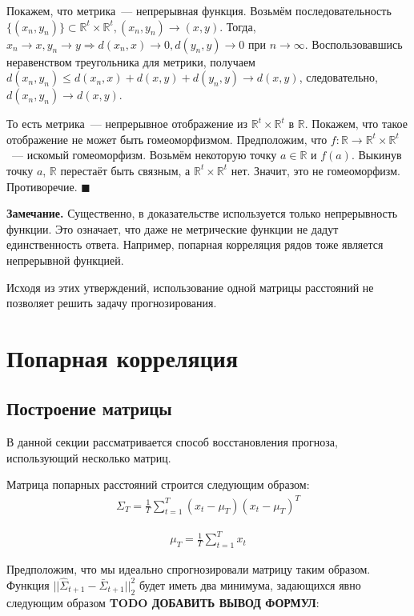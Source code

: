\documentclass{article}
\begin{document}
Покажем, что метрика~--- непрерывная функция. Возьмём последовательность $\{(x_n, y_n)\} \subset \mathbb{R}^t \times \mathbb{R}^t, (x_n, y_n) \to (x, y)$. Тогда, $x_n\to x, y_n\to y \Rightarrow d(x_n,x)\to 0 ,d(y_n,y)\to 0$ при $n \to \infty$. Воспользовавшись неравенством треугольника для метрики, получаем $d(x_n,y_n)\leq d(x_n,x)+d(x,y)+d(y_n,y)\to d(x,y)$, следовательно, $d(x_n,y_n)\to d(x,y)$.

То есть метрика~--- непрерывное отображение из $\mathbb{R}^t \times \mathbb{R}^t$ в $\mathbb{R}$. Покажем, что такое отображение не может быть гомеоморфизмом. Предположим, что $f: \mathbb{R} \to \mathbb{R}^t \times \mathbb{R}^t$~--- искомый гомеоморфизм. Возьмём некоторую точку $a \in \mathbb{R}$ и $f(a)$. Выкинув точку $a$, $\mathbb{R}$ перестаёт быть связным, а $\mathbb{R}^t \times \mathbb{R}^t$ нет. Значит, это не гомеоморфизм. Противоречие.
$\blacksquare$

\textbf{Замечание.} Существенно, в доказательстве используется только непрерывность функции. Это означает, что даже не метрические функции не дадут единственность ответа. Например, попарная корреляция рядов тоже является непрерывной функцией.

Исходя из этих утверждений, использование одной матрицы расстояний не позволяет решить задачу прогнозирования.

\section{Попарная корреляция}

\subsection{Построение матрицы}

В данной секции рассматривается способ восстановления прогноза, использующий несколько матриц.

Матрица попарных расстояний строится следующим образом:
\begin{gather*}
	{\Sigma}_T = \frac{1}{T} \sum_{t=1}^{T} (x_t - \mu_T)(x_t - \mu_T)^T
\end{gather*}

\begin{gather*}
	\mu_T = \frac{1}{T} \sum_{t=1}^{T} x_t
\end{gather*}

Предположим, что мы идеально спрогнозировали матрицу таким образом. Функция $||\hat{\Sigma}_{t+1} - \bar{\Sigma}_{t+1}||_2^2$ будет иметь два минимума, задающихся явно следующим образом \textbf{TODO ДОБАВИТЬ ВЫВОД ФОРМУЛ}:
\end{document}
